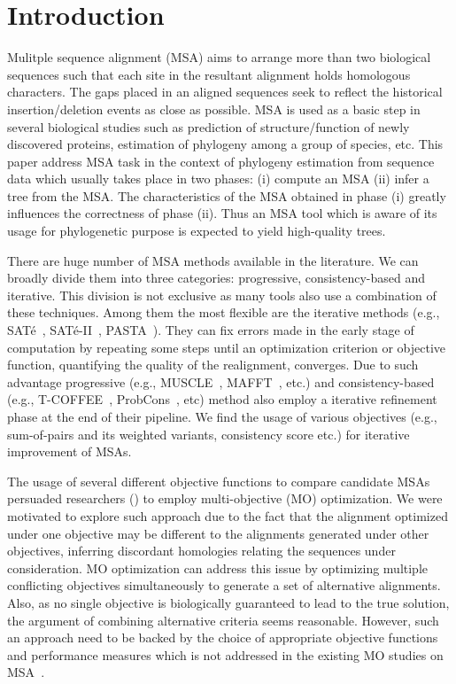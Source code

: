 \section{Introduction}
\label{sec:intro}
Mulitple sequence alignment (MSA) aims to arrange more than two biological sequences such that each site in the resultant alignment holds homologous characters. The gaps placed in an aligned sequences seek to reflect the historical insertion/deletion events as close as possible. MSA is used as a basic step in several biological studies such as prediction of structure/function of newly discovered proteins, estimation of phylogeny among a group of species, etc. This paper address MSA task in the context of phylogeny estimation from sequence data which usually takes place in two phases: (i) compute an MSA (ii) infer a tree from the MSA. The characteristics of the MSA obtained in phase (i) greatly influences the correctness of phase (ii). Thus an MSA tool which is aware of its usage for phylogenetic purpose is expected to yield high-quality trees.  

There are huge number of MSA methods available in the literature. We can broadly divide them into three categories: progressive, consistency-based  and iterative. This division is not exclusive as many tools also use a combination of these techniques. Among them the most flexible are the iterative methods (e.g., SAT\'e~\cite{liu2009rapid}, SAT\'e-II~\cite{liu2012sate}, PASTA~\cite{mirarab2015pasta}). They can fix errors made in the early stage of computation by repeating some steps until an optimization criterion or objective function, quantifying the quality of the realignment, converges. Due to such advantage progressive (e.g., MUSCLE~\cite{edgar2004muscle}, MAFFT~\cite{katoh2002mafft}, etc.) and consistency-based (e.g., T-COFFEE~\cite{notredame2000t}, ProbCons~\cite{do2005probcons}, etc) method also employ a iterative refinement phase at the end of their pipeline. We find the usage of various objectives (e.g., sum-of-pairs and its weighted variants, consistency score etc.) for iterative improvement of MSAs. 

The usage of several different objective functions to compare candidate MSAs persuaded researchers (\cite{da2010alineaga, ortuno2013optimizing, soto2014multi, abbasi2015local, rubio2016hybrid,zambrano2017comparing, rubio2018characteristic, benitez2020sequoya}) to employ multi-objective (MO) optimization. We were motivated to explore such approach due to the fact that the alignment optimized under one objective may be different to the alignments generated under other objectives, inferring discordant
homologies relating the sequences under consideration. MO optimization can address this issue by
optimizing multiple conflicting objectives simultaneously to
generate a set of alternative alignments. Also, as no single objective is biologically guaranteed to lead to the true solution, the argument of combining alternative criteria seems reasonable. However, such an approach need to be backed by the choice of appropriate objective functions and performance measures which is not addressed in the existing MO studies on MSA~\cite{nayeem2020multiobjective}.  %


